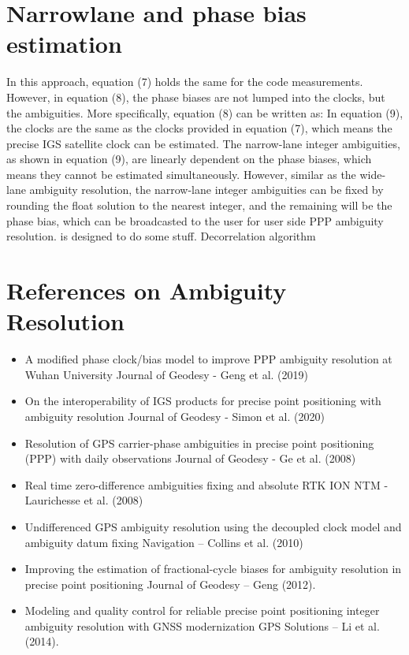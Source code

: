 \section{Narrowlane and phase bias estimation}
%
In this approach, equation (7) holds the same for the code measurements. However, in equation (8),
the phase biases are not lumped into the clocks, but the ambiguities. More specifically, equation (8)
can be written as:
%
In equation (9), the clocks are the same as the clocks provided in equation (7), which means the
precise IGS satellite clock can be estimated.
The narrow-lane integer ambiguities, as shown in equation (9), are linearly dependent on the phase
biases, which means they cannot be estimated simultaneously. However, similar as the wide-lane
ambiguity resolution, the narrow-lane integer ambiguities can be fixed by rounding the float solution
to the nearest integer, and the remaining will be the phase bias, which can be broadcasted to the
user for user side PPP ambiguity resolution.
%
 is designed to do some stuff.
%
%
%
Decorrelation algorithm
%
%
\section{References on Ambiguity Resolution}
%
\begin{itemize}
    \item A modified phase clock/bias model to improve PPP ambiguity resolution at Wuhan University Journal of Geodesy - Geng et al. (2019)
    \item On the interoperability of IGS products for precise point positioning with ambiguity resolution Journal of Geodesy - Simon et al. (2020)
    \item Resolution of GPS carrier-phase ambiguities in precise point positioning (PPP) with daily observations Journal of Geodesy - Ge et al. (2008)
    \item Real time zero-difference ambiguities fixing and absolute RTK ION NTM - Laurichesse et al. (2008)
    \item Undifferenced GPS ambiguity resolution using the decoupled clock model and ambiguity datum fixing Navigation – Collins et al. (2010)
    \item Improving the estimation of fractional-cycle biases for ambiguity resolution in precise point positioning Journal of Geodesy – Geng (2012).
    \item Modeling and quality control for reliable precise point positioning integer ambiguity resolution with GNSS modernization
GPS Solutions – Li et al. (2014).
\end{itemize}
